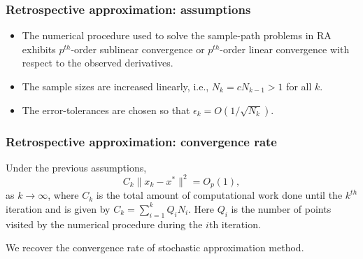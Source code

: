 \documentclass{beamer}
\begin{document}
\begin{frame}
\frametitle{Retrospective approximation: assumptions}

\begin{itemize}
\item
The numerical procedure used to solve the sample-path problems in RA exhibits $p^{th}$-order sublinear convergence or $p^{th}$-order linear convergence with respect to the observed derivatives.
\item
The sample sizes are increased linearly, i.e., $N_k = c N_{k - 1} > 1$ for all $k$.
\item
The error-tolerances are chosen so that
$\epsilon_k= O(1/\sqrt{N_k})$.
\end{itemize}

\end{frame}

\begin{frame}
\frametitle{Retrospective approximation: convergence rate}

Under the previous assumptions, %
$$
C_k \| x_k - x^* \|^2 = O_p(1),
$$
as $k \rightarrow \infty$, where $C_k$ is the total amount of computational work done until the $k^{th}$ iteration and is given by $C_k = \sum^k_{i = 1} Q_iN_i$.
Here $Q_i$ is the number of points visited by the numerical procedure during the $i$th iteration.

\mbox{}

We recover the convergence rate of stochastic approximation method.

\end{frame}



\end{document}
